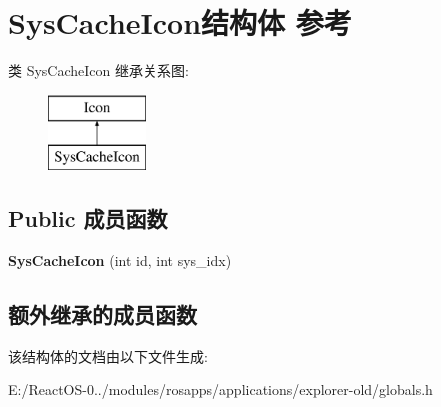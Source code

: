 \hypertarget{struct_sys_cache_icon}{}\section{Sys\+Cache\+Icon结构体 参考}
\label{struct_sys_cache_icon}
类 Sys\+Cache\+Icon 继承关系图\+:\begin{figure}[H]
\begin{center}
\leavevmode
\includegraphics[height=2.000000cm]{struct_sys_cache_icon}
\end{center}
\end{figure}
\subsection*{Public 成员函数}
\begin{DoxyCompactItemize}
\item 
\mbox{\label{struct_sys_cache_icon_a1f890ad8ebaec61b6999bb50c76f02ec}} 
{\bfseries Sys\+Cache\+Icon} (int id, int sys\+\_\+idx)
\end{DoxyCompactItemize}
\subsection*{额外继承的成员函数}


该结构体的文档由以下文件生成\+:\begin{DoxyCompactItemize}
\item 
E\+:/\+React\+O\+S-\/0../modules/rosapps/applications/explorer-\/old/globals.\+h\end{DoxyCompactItemize}
